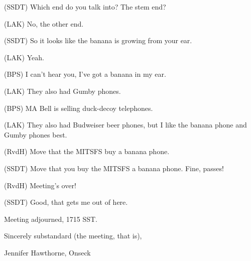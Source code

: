 \documentclass[12pt]{article}
\begin{document}
(SSDT) Which end do you talk into? The stem end?

(LAK) No, the other end.

(SSDT) So it looks like the banana is growing from your ear.

(LAK) Yeah.

(BPS) I can't hear you, I've got a banana in my ear.

(LAK) They also had Gumby phones.

(BPS) MA Bell is selling duck-decoy telephones.

(LAK) They also had Budweiser beer phones, but I like the banana phone and Gumby phones best.

(RvdH) Move that the MITSFS buy a banana phone.

(SSDT) Move that you buy the MITSFS a banana phone. Fine, passes!

(RvdH) Meeting's over!

(SSDT) Good, that gets me out of here.

\vspace{12pt}

\noindent
Meeting adjourned, 1715 SST.

\vspace{18pt}

\centerline{Sincerely substandard (the meeting, that is),}
\centerline{Jennifer Hawthorne, Onseck}
\end{document}
